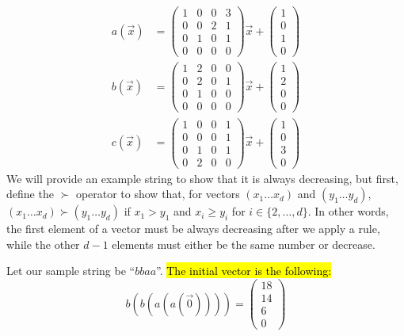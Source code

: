 \begin{align*}
a(\Vec{x}) &= \begin{pmatrix}
1&0&0&3\\
0&0&2&1\\
0&1&0&1\\
0&0&0&0
\end{pmatrix} \Vec{x} + \begin{pmatrix}
1\\
0\\
1\\
0
\end{pmatrix}\\
b(\Vec{x}) &= \begin{pmatrix}
1&2&0&0\\
0&2&0&1\\
0&1&0&0\\
0&0&0&0
\end{pmatrix} \Vec{x} + \begin{pmatrix}
1\\
2\\
0\\
0
\end{pmatrix}\\
c(\Vec{x}) &= \begin{pmatrix}
1&0&0&1\\
0&0&0&1\\
0&1&0&1\\
0&2&0&0
\end{pmatrix} \Vec{x} + \begin{pmatrix}
1\\
0\\
3\\
0
\end{pmatrix}
\end{align*}
We will provide an example string to show that it is always decreasing, but first, define the $\succ$ operator to show that, for vectors $(x_1 \ldots x_d)$ and $(y_1 \ldots y_d)$, $(x_1 \ldots x_d) \succ (y_1 \ldots y_d)$ if $x_1 > y_1$ and $x_i \geq y_i$ for $i \in \{2, \ldots, d\}$. In other words, the first element of a vector must be always decreasing after we apply a rule, while the other $d-1$ elements must either be the same number or decrease. \par
Let our sample string be ``$bbaa$''. \hl{The initial vector is the following:}
\[
b(b(a(a(\Vec{0}))))= \begin{pmatrix}
18\\14\\6\\0 \end{pmatrix}
\] 
